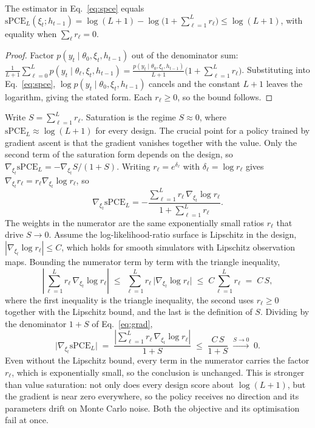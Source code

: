 \begin{lemma}
\label{lem:saturation}
The estimator in Eq.~\eqref{eq:spce} equals
$\mathrm{sPCE}_L(\xi_t;h_{t-1}) = \log(L+1) - \log\!\big(1+\sum_{\ell=1}^{L}r_\ell\big)\le\log(L+1)$,
with equality when $\sum_\ell r_\ell = 0$.
\end{lemma}
\begin{proof}
Factor $p(y_t\mid\theta_0,\xi_t,h_{t-1})$ out of the denominator sum:
$\frac{1}{L+1}\sum_{\ell=0}^{L}p(y_t\mid\theta_\ell,\xi_t,h_{t-1})
= \frac{p(y_t\mid\theta_0,\xi_t,h_{t-1})}{L+1}\big(1+\sum_{\ell=1}^{L}r_\ell\big)$.
Substituting into Eq.~\eqref{eq:spce}, $\log p(y_t\mid\theta_0,\xi_t,h_{t-1})$ cancels
and the constant $L+1$ leaves the logarithm, giving the stated form. Each $r_\ell\ge0$,
so the bound follows.
\end{proof}

Write $S=\sum_{\ell=1}^{L}r_\ell$. Saturation is the regime $S\approx 0$, where
$\mathrm{sPCE}_L\approx\log(L+1)$ for every design. The crucial point for a policy
trained by gradient ascent is that the gradient vanishes together with the value.
Only the second term of the saturation form depends on the design, so
$\nabla_{\xi_t}\mathrm{sPCE}_L=-\nabla_{\xi_t}S/(1+S)$. Writing $r_\ell=e^{\delta_\ell}$
with $\delta_\ell=\log r_\ell$ gives $\nabla_{\xi_t}r_\ell=r_\ell\nabla_{\xi_t}\log r_\ell$,
so
\begin{equation}
\label{eq:grad}
\nabla_{\xi_t}\mathrm{sPCE}_L
= -\frac{\sum_{\ell=1}^{L}r_\ell\,\nabla_{\xi_t}\log r_\ell}{1+\sum_{\ell=1}^{L}r_\ell}.
\end{equation}
The weights in the numerator are the same exponentially small ratios $r_\ell$ that
drive $S\to0$. Assume the log-likelihood-ratio surface is Lipschitz in the design,
$|\nabla_{\xi_t}\log r_\ell|\le C$, which holds for smooth simulators with Lipschitz
observation maps. Bounding the numerator term by term with the triangle inequality,
\begin{equation}
\label{eq:grad-num}
\left|\sum_{\ell=1}^{L} r_\ell\,\nabla_{\xi_t}\log r_\ell\right|
\;\le\; \sum_{\ell=1}^{L} r_\ell\,\bigl|\nabla_{\xi_t}\log r_\ell\bigr|
\;\le\; C\sum_{\ell=1}^{L} r_\ell
\;=\; C\,S ,
\end{equation}
where the first inequality is the triangle inequality, the second uses
$r_\ell\ge0$ together with the Lipschitz bound, and the last is the definition of
$S$. Dividing by the denominator $1+S$ of Eq.~\eqref{eq:grad},
\begin{equation}
\label{eq:grad-bound}
\bigl|\nabla_{\xi_t}\mathrm{sPCE}_L\bigr|
\;=\; \frac{\left|\sum_{\ell=1}^{L} r_\ell\,\nabla_{\xi_t}\log r_\ell\right|}{1+S}
\;\le\; \frac{C\,S}{1+S}
\;\xrightarrow{S\to0}\; 0 .
\end{equation}
Even without the Lipschitz bound, every term in the numerator carries the factor
$r_\ell$, which is exponentially small, so the conclusion is unchanged. This is
stronger than value saturation: not only does every design score about $\log(L+1)$,
but the gradient is near zero everywhere, so the policy receives no direction and its
parameters drift on Monte Carlo noise. Both the objective and its optimisation fail
at once.

